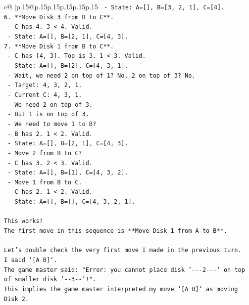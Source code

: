 \documentclass{article}
\begin{document}
{\begin{supertabular}{c@{$\;$}|p{.15\linewidth}@{}p{.15\linewidth}p{.15\linewidth}p{.15\linewidth}p{.15\linewidth}p{.15\linewidth}}
{{{\texttt{   {-} State: A={[}{]}, B={[}3, 2, 1{]}, C={[}4{]}.} \\
\texttt{6. **Move Disk 3 from B to C**.} \\
\texttt{   {-} C has 4. 3 < 4. Valid.} \\
\texttt{   {-} State: A={[}{]}, B={[}2, 1{]}, C={[}4, 3{]}.} \\
\texttt{7. **Move Disk 1 from B to C**.} \\
\texttt{   {-} C has {[}4, 3{]}. Top is 3. 1 < 3. Valid.} \\
\texttt{   {-} State: A={[}{]}, B={[}2{]}, C={[}4, 3, 1{]}.} \\
\texttt{   {-} Wait, we need 2 on top of 1? No, 2 on top of 3? No.} \\
\texttt{   {-} Target: 4, 3, 2, 1.} \\
\texttt{   {-} Current C: 4, 3, 1.} \\
\texttt{   {-} We need 2 on top of 3.} \\
\texttt{   {-} But 1 is on top of 3.} \\
\texttt{   {-} We need to move 1 to B?} \\
\texttt{   {-} B has 2. 1 < 2. Valid.} \\
\texttt{   {-} State: A={[}{]}, B={[}2, 1{]}, C={[}4, 3{]}.} \\
\texttt{   {-} Move 2 from B to C?} \\
\texttt{     {-} C has 3. 2 < 3. Valid.} \\
\texttt{     {-} State: A={[}{]}, B={[}1{]}, C={[}4, 3, 2{]}.} \\
\texttt{   {-} Move 1 from B to C.} \\
\texttt{     {-} C has 2. 1 < 2. Valid.} \\
\texttt{     {-} State: A={[}{]}, B={[}{]}, C={[}4, 3, 2, 1{]}.} \\
\\ 
\texttt{This works!} \\
\texttt{The first move in this sequence is **Move Disk 1 from A to B**.} \\
\\ 
\texttt{Let's double check the very first move I made in the previous turn.} \\
\texttt{I said `{[}A B{]}`.} \\
\texttt{The game master said: "Error: you cannot place disk '{-}{-}{-}2{-}{-}{-}' on top of smaller disk '{-}{-}3{-}{-}'!".} \\
\texttt{This implies the game master interpreted my move `{[}A B{]}` as moving Disk 2.} \\
}}}
\end{supertabular}}
\end{document}
